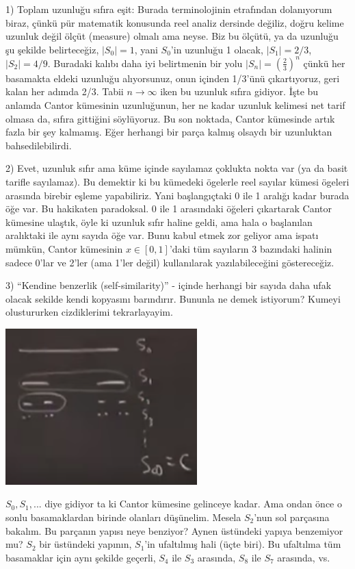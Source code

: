 \documentclass[12pt,fleqn]{article}\usepackage{../../common}
\begin{document}
1) Toplam uzunluğu sıfıra eşit: Burada terminolojinin etrafından
dolanıyorum biraz, çünkü pür matematik konusunda reel analiz dersinde
değiliz, doğru kelime uzunluk değil ölçüt (measure) olmalı ama neyse. Biz
bu ölçütü, ya da uzunluğu şu şekilde belirteceğiz, $|S_0| = 1$, yani
$S_0$'in uzunluğu 1 olacak, $|S_1| = 2/3$, $|S_2| = 4/9$. Buradaki kalıbı
daha iyi belirtmenin bir yolu $|S_n| = \left(\frac{2}{3}\right)^n$ çünkü
her basamakta eldeki uzunluğu alıyorsunuz, onun içinden 1/3'ünü
çıkartıyoruz, geri kalan her adımda 2/3. Tabii $n \to \infty$ iken bu
uzunluk sıfıra gidiyor. İşte bu anlamda Cantor kümesinin uzunluğunun, her
ne kadar uzunluk kelimesi net tarif olmasa da, sıfıra gittiğini
söylüyoruz. Bu son noktada, Cantor kümesinde artık fazla bir şey
kalmamış. Eğer herhangi bir parça kalmış olsaydı bir uzunluktan
bahsedilebilirdi.

2) Evet, uzunluk sıfır ama küme içinde sayılamaz çoklukta nokta var (ya da
basit tarifle sayılamaz). Bu demektir ki bu kümedeki ögelerle reel sayılar
kümesi ögeleri arasında birebir eşleme yapabiliriz. Yani başlangıçtaki 0
ile 1 aralığı kadar burada öğe var. Bu hakikaten paradoksal. 0 ile 1
arasındaki öğeleri çıkartarak Cantor kümesine ulaştık, öyle ki uzunluk
sıfır haline geldi, ama hala o başlanılan aralıktaki ile aynı sayıda öğe
var. Bunu kabul etmek zor geliyor ama ispatı mümkün, Cantor kümesinin
$x \in [0,1]$'daki tüm sayıların 3 bazındaki halinin sadece 0'lar ve
2'ler (ama 1'ler değil) kullanılarak yazılabileceğini göstereceğiz.

3) ``Kendine benzerlik (self-similarity)'' - içinde herhangi bir sayıda daha
ufak olacak sekilde kendi kopyasını barındırır. Bununla ne demek istiyorum?
Kumeyi olustururken cizdiklerimi tekrarlayayim. 

\includegraphics[width=20em]{23_29.png}

$S_0,S_1,...$ diye gidiyor ta ki Cantor kümesine gelinceye kadar. Ama ondan
önce o sonlu basamaklardan birinde olanları düşünelim. Mesela $S_2$'nun sol
parçasına bakalım. Bu parçanın yapısı neye benziyor? Aynen üstündeki yapıya
benzemiyor mu?  $S_2$ bir üstündeki yapının, $S_1$'in ufaltılmış hali (üçte
biri). Bu ufaltılma tüm basamaklar için aynı şekilde geçerli, $S_4$ ile
$S_3$ arasında, $S_8$ ile $S_7$ arasında, vs.
\end{document}
